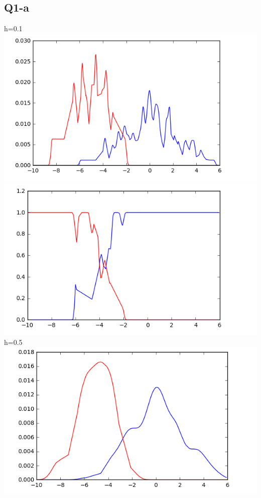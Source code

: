 \documentclass[11]{article}
\begin{document}
\subsection*{Q1-a}
h=0.1 \\
\includegraphics[scale=0.75]{1_a_1.png} \\
\includegraphics[scale=0.75]{1-a-2.png} \\
h=0.5 \\
\includegraphics[scale=0.75]{1-a-3.png} \\
\end{document}
